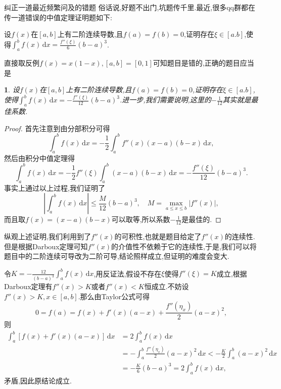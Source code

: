 \documentclass[UTF8,no-math,12pt,openany,table,dvipsnames,svgnames]{book}
\newtheorem{example}{}
\renewcommand{\le}{\leqslant}
\begin{document}
\setcounter{example}{0}
\begin{MYBOX}[colbacktitle=blue]{纠正一道最近频繁问及的错题}
俗话说,好题不出门,坑题传千里.最近,很多qq群都在传一道错误的中值定理证明题如下:

设$f(x)$在$[a,b]$上有二阶连续导数,且$f(a)=f(b)=0$,证明存在$\xi\in[a.b]$,使得$\int_a^bf(x)\,\mathrm dx=\frac{f''(\xi)}6(b-a)^3$.

直接取反例$f(x)=x(1-x),[a,b]=[0,1]$可知题目是错的,正确的题目应当是
\begin{example}
设$f(x)$在$[a,b]$上有二阶连续导数,且$f(a)=f(b)=0$,证明存在$\xi\in[a.b]$,使得$\int_a^bf(x)\,\mathrm dx=-\frac{f''(\xi)}{12}(b-a)^3$.进一步,我们需要说明,这里的$-\frac1{12}$其实就是最佳系数.
\end{example}
\begin{proof}
首先注意到由分部积分可得
\[\int_a^bf(x)\,\mathrm dx=-\frac12\int_a^bf''(x)(x-a)(b-x)\,\mathrm dx,\]
然后由积分中值定理得
\[\int_a^bf(x)\,\mathrm dx=-\frac12f''(\xi)\int_a^b(x-a)(b-x)\,\mathrm dx=-\frac{f''(\xi)}{12}(b-a)^3.\]
事实上通过以上过程,我们证明了
\[\left|\int_a^bf(x)\,\mathrm dx\right|\le \frac{M}{12}(b-a)^3,\quad M=\max_{a\le x\le b}|f''(x)|,\]
而且取$f(x)=(x-a)(b-x)$可以取等,所以系数$-\frac1{12}$是最佳的.
\end{proof}

纵观上述证明,我们利用到了$f''(x)$的可积性,也就是题目给定了$f''(x)$的连续性.但是根据Darboux定理可知$f''(x)$的介值性不依赖于它的连续性,于是,我们可以将题目中的二阶连续可导改为二阶可导,结论照样成立,但证明的难度会变大.

令$K=-\frac{12}{(b-a)^3}\int_a^bf(x)\,\mathrm dx$,用反证法,假设不存在$\xi$使得$f''(\xi)=K$成立,根据Darboux定理有$f''(x)>K$或者$f''(x)<K$恒成立.不妨设$f''(x)>K,x\in[a,b]$.那么由Taylor公式可得
\[0=f(a)=f(x)+f'(x)(a-x)+\frac{f''(\eta_x)}2(a-x)^2,\]
则
\begin{align*}
\int_a^b[f(x)+f'(x)(a-x)]\,\mathrm dx&=2\int_a^bf(x)\,\mathrm dx\\
&=-\int_a^b\frac{f''(\eta_x)}2(a-x)^2\,\mathrm dx<-\frac K2\int_a^b(a-x)^2\,\mathrm dx\\
&=-\frac K{6}(b-a)^3=2\int_a^bf(x)\,\mathrm dx,
\end{align*}
矛盾,因此原结论成立.
\end{MYBOX}
\end{document}
